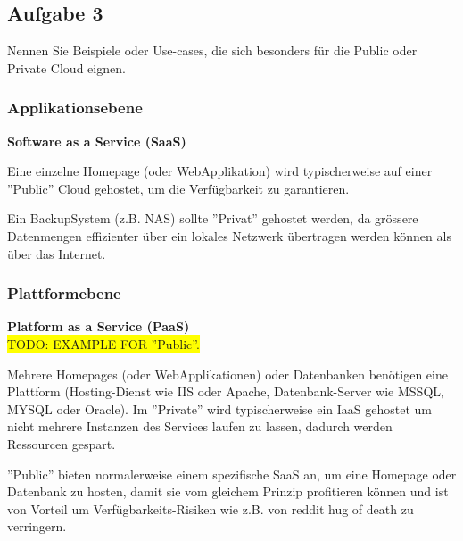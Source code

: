 \documentclass[11pt,titlepage]{article}
\newenvironment{shadedquotation}
 {\begin{shaded*}
  \quoting[leftmargin=0pt, vskip=0pt]
 }
 {\endquoting
 \end{shaded*}
}
\begin{document}
  \par\medskip

\subsection{Aufgabe 3}
\label{sec:Aufgabe-3}

\begin{shadedquotation}
  Nennen Sie Beispiele oder Use-cases, die sich besonders für die Public oder Private Cloud eignen.
\end{shadedquotation}

\subsubsection{Applikationsebene}
\label{subsec:Aufgabe-3_Applikationsebene}
{\large\bf Software as a Service (SaaS)} \\\medskip

Eine einzelne Homepage (oder WebApplikation) wird typischerweise auf einer ''Public'' Cloud gehostet, um die Verfügbarkeit zu garantieren.
\medskip

Ein BackupSystem (z.B. NAS) sollte ''Privat'' gehostet werden, da grössere Datenmengen effizienter über ein lokales Netzwerk übertragen werden können als über das Internet.

\subsubsection{Plattformebene}
\label{subsec:Aufgabe-3_Plattformebene}
{\large\bf Platform as a Service (PaaS)} \\\medskip
\colorbox{yellow}{TODO: EXAMPLE FOR ''Public''.}
\par\medskip

Mehrere Homepages (oder WebApplikationen) oder Datenbanken benötigen eine Plattform (Hosting-Dienst wie IIS oder Apache, Datenbank-Server wie MSSQL, MYSQL oder Oracle).
Im ''Private'' wird typischerweise ein IaaS gehostet um nicht mehrere Instanzen des Services laufen zu lassen, dadurch werden Ressourcen gespart.

''Public'' bieten normalerweise einem spezifische SaaS an, um eine Homepage oder Datenbank zu hosten, damit sie vom gleichem Prinzip profitieren können und ist von Vorteil um Verfügbarkeits-Risiken wie z.B. von reddit hug of death zu verringern.
\end{document}
